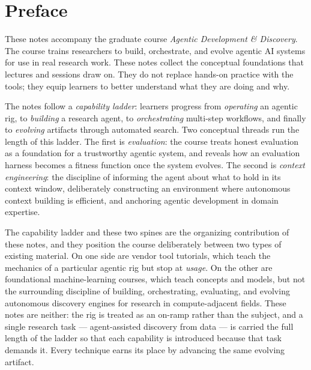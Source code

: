 \chapter*{Preface}

These notes accompany the graduate course \emph{Agentic Development \& Discovery}.
The course trains researchers to build, orchestrate, and evolve agentic AI systems for use in real research work.
These notes collect the conceptual foundations that lectures and sessions draw on.
They do not replace hands-on practice with the tools; they equip learners to better understand what they are doing and why.

The notes follow a \emph{capability ladder}: learners progress from \emph{operating} an agentic rig, to \emph{building} a research agent, to \emph{orchestrating} multi-step workflows, and finally to \emph{evolving} artifacts through automated search.
Two conceptual threads run the length of this ladder.
The first is \emph{evaluation}: the course treats honest evaluation as a foundation for a trustworthy agentic system, and reveals how an evaluation harness becomes a fitness function once the system evolves.
The second is \emph{context engineering}: the discipline of informing the agent about what to hold in its context window, deliberately constructing an environment where autonomous context building is efficient, and anchoring agentic development in domain expertise.

The capability ladder and these two spines are the organizing contribution of these notes, and they position the course deliberately between two types of existing material.
On one side are vendor tool tutorials, which teach the mechanics of a particular agentic rig but stop at \emph{usage}.
On the other are foundational machine-learning courses, which teach concepts and models, but not the surrounding discipline of building, orchestrating, evaluating, and evolving autonomous discovery engines for research in compute-adjacent fields.
These notes are neither: the rig is treated as an on-ramp rather than the subject, and a single research task --- agent-assisted discovery from data --- is carried the full length of the ladder so that each capability is introduced because that task demands it.
Every technique earns its place by advancing the same evolving artifact.

